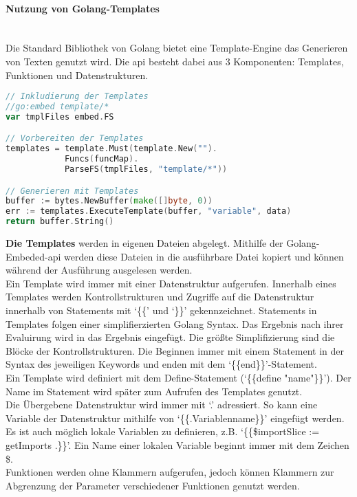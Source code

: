 \documentclass[./einleitung.tex]{subfiles}
\begin{document}
    \paragraph{Nutzung von Golang-Templates}\mbox{}\\
    Die Standard Bibliothek von Golang bietet eine Template-Engine das Generieren von Texten genutzt wird.
    Die \acrshort{api} besteht dabei aus 3 Komponenten: Templates, Funktionen und Datenstrukturen.
    \begin{lstlisting}[language=Go, caption=Ablauf der Template-\acrshort{api}, label=lst:template]
// Inkludierung der Templates
//go:embed template/*
var tmplFiles embed.FS

// Vorbereiten der Templates
templates = template.Must(template.New("").
            Funcs(funcMap).
            ParseFS(tmplFiles, "template/*"))

// Generieren mit Templates
buffer := bytes.NewBuffer(make([]byte, 0))
err := templates.ExecuteTemplate(buffer, "variable", data)
return buffer.String()
    \end{lstlisting}
    \textbf{Die Templates} werden in eigenen Dateien abgelegt.
    Mithilfe der Golang-Embeded-\acrshort{api} werden diese Dateien in die ausführbare Datei kopiert und können während der Ausführung ausgelesen werden.\\
    Ein Template wird immer mit einer Datenstruktur aufgerufen.
    Innerhalb eines Templates werden Kontrollstrukturen und Zugriffe auf die Datenstruktur innerhalb von Statements mit `\{\{' und `\}\}' gekennzeichnet.
    Statements in Templates folgen einer simplifierzierten Golang Syntax.
    Das Ergebnis nach ihrer Evaluirung wird in das Ergebnis eingefügt.
    Die größte Simplifizierung sind die Blöcke der Kontrollstrukturen.
    Die Beginnen immer mit einem Statement in der Syntax des jeweiligen Keywords und enden mit dem `\{\{end\}\}'-Statement.\\
    Ein Template wird definiert mit dem Define-Statement (`\{\{define "name"\}\}').
    Der Name im Statement wird später zum Aufrufen des Templates genutzt. \\
    Die Übergebene Datenstruktur wird immer mit `.' adressiert.
    So kann eine Variable der Datenstruktur mithilfe von `\{\{.Variablenname\}\}' eingefügt werden.
    Es ist auch möglich lokale Variablen zu definieren, z.B. `\{\{\$importSlice := getImports .\}\}'.
    Ein Name einer lokalen Variable beginnt immer mit dem Zeichen \$.\\
    Funktionen werden ohne Klammern aufgerufen, jedoch können Klammern zur Abgrenzung der Parameter verschiedener Funktionen genutzt werden.
\end{document}
